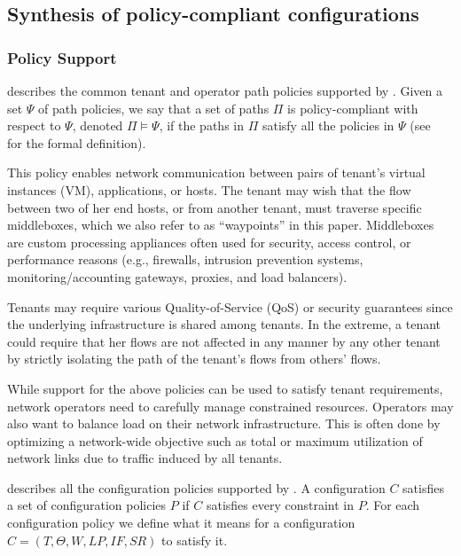\subsection{Synthesis of policy-compliant configurations}

\subsubsection{Policy Support}
 describes 
the common tenant and operator path policies 
supported by \name. 
Given  a set $\Psi$ of
path policies, we say that
a set of paths $\Pi$ is policy-compliant with respect to $\Psi$, denoted 
$\Pi \models \Psi$,
if the paths in $\Pi$ satisfy all the policies in $\Psi$ (see~\cite{genesis} for the formal definition). 




This policy enables network communication
between pairs of tenant's virtual instances (VM), 
applications, or hosts.  
The tenant may wish that the flow
between two of her end hosts, or from another tenant, must traverse
specific middleboxes, which we also refer to as ``waypoints'' in
this paper. Middleboxes are custom processing appliances often used
for security, access control, or performance reasons (e.g.,
firewalls, intrusion prevention systems, monitoring/accounting
gateways, proxies, and load balancers). 

 Tenants may require various
Quality-of-Service (QoS) or security guarantees since the 
underlying infrastructure is shared among tenants. In the extreme, a
tenant could require that her flows are not affected in any manner
by any other tenant by strictly isolating the path of the tenant's
flows from others' flows. 

While support for the above policies can be used to satisfy tenant 
requirements, network operators need to 
carefully manage constrained resources. Operators may also want
to balance load on their network infrastructure. This is often done
by optimizing a network-wide objective such as total or maximum
utilization of network links due to traffic induced by all tenants. 


 describes all the configuration policies supported by \name.
A configuration $C$ satisfies a set of configuration policies $P$
if $C$ satisfies every constraint in $P$.
For each configuration policy 
we define what it means for  a configuration $C=(T,\Theta,W,LP,IF,SR)$ to satisfy it.

